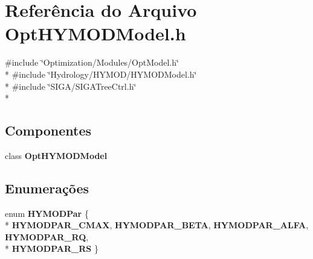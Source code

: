\section{Referência do Arquivo Opt\+H\+Y\+M\+O\+D\+Model.\+h}
\label{_opt_h_y_m_o_d_model_8h}
{\ttfamily \#include \char`\"{}Optimization/\+Modules/\+Opt\+Model.\+h\char`\"{}}\\*
{\ttfamily \#include \char`\"{}Hydrology/\+H\+Y\+M\+O\+D/\+H\+Y\+M\+O\+D\+Model.\+h\char`\"{}}\\*
{\ttfamily \#include \char`\"{}S\+I\+G\+A/\+S\+I\+G\+A\+Tree\+Ctrl.\+h\char`\"{}}\\*
\subsection*{Componentes}
\begin{DoxyCompactItemize}
\item 
class {\bf Opt\+H\+Y\+M\+O\+D\+Model}
\end{DoxyCompactItemize}
\subsection*{Enumerações}
\begin{DoxyCompactItemize}
\item 
enum {\bf H\+Y\+M\+O\+D\+Par} \{ \\*
{\bf H\+Y\+M\+O\+D\+P\+A\+R\+\_\+\+C\+M\+AX}, 
{\bf H\+Y\+M\+O\+D\+P\+A\+R\+\_\+\+B\+E\+TA}, 
{\bf H\+Y\+M\+O\+D\+P\+A\+R\+\_\+\+A\+L\+FA}, 
{\bf H\+Y\+M\+O\+D\+P\+A\+R\+\_\+\+RQ}, 
\\*
{\bf H\+Y\+M\+O\+D\+P\+A\+R\+\_\+\+RS}
 \}
\end{DoxyCompactItemize}
